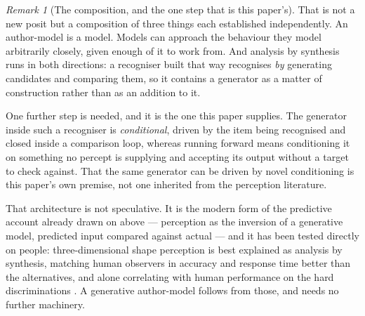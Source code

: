 \documentclass[11pt,a4paper]{article}
\theoremstyle{remark}\newtheorem{remark}[definition]{Remark}
\begin{document}
\begin{remark}[The composition, and the one step that is this paper's]\label{rem:other-model-composition}
That is not a new posit but a composition of three things each established independently. An
author-model is a model. Models can approach the behaviour they model arbitrarily closely, given
enough of it to work from. And analysis by synthesis runs in both directions: a recogniser built
that way recognises \emph{by} generating candidates and comparing them, so it contains a generator
as a matter of construction rather than as an addition to it.

One further step is needed, and it is the one this paper supplies. The generator inside such a
recogniser is \emph{conditional}, driven by the item being recognised and closed inside a
comparison loop, whereas running forward means conditioning it on something no percept is
supplying and accepting its output without a target to check against. That the same generator can
be driven by novel conditioning is this paper's own premise, not one inherited from the perception
literature.
\end{remark}

That architecture is not speculative. It is the modern form of the predictive account already
drawn on above --- perception as the inversion of a generative model, predicted input compared
against actual \citep{friston2010} --- and it has been tested directly on people: three-dimensional
shape perception is best explained as analysis by synthesis, matching human observers in accuracy
and response time better than the alternatives, and alone correlating with human performance on
the hard discriminations \citep{yildirim2024}. A generative author-model follows from those, and
needs no further machinery.
\end{document}
